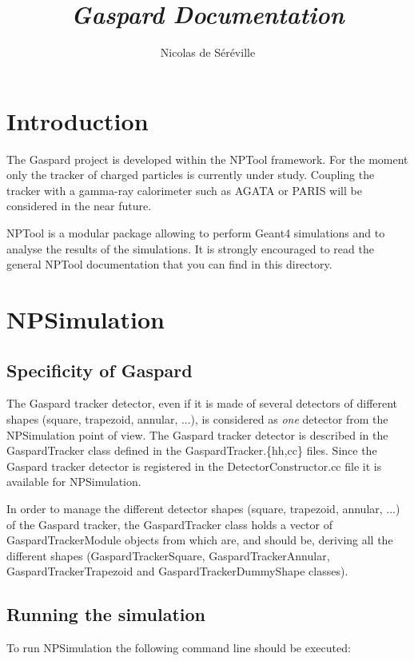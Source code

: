 \documentclass[a4paper,12pt]{article}
\begin{document}
\title{\emph{Gaspard Documentation}}
\author{Nicolas de S\'er\'eville}

\maketitle 
\pagebreak
\tableofcontents
\pagebreak


\section{Introduction}
The Gaspard project is developed within the NPTool framework. For the 
moment only the tracker of charged particles is currently under study.
Coupling the tracker with a gamma-ray calorimeter such as AGATA or
PARIS will be considered in the near future. 

NPTool is a modular package allowing to perform Geant4 simulations and to 
analyse the results of the simulations. It is strongly encouraged to read 
the general NPTool documentation that you can find in this directory.


\section{NPSimulation}
\subsection{Specificity of Gaspard}
The Gaspard tracker detector, even if it is made of several detectors of
different shapes (square, trapezoid, annular, ...), is considered as {\it one} 
detector from the NPSimulation point of view. The Gaspard tracker detector 
is described in the GaspardTracker class defined in the 
GaspardTracker.\{hh,cc\} files. Since the Gaspard tracker detector is 
registered in the DetectorConstructor.cc file it is available for NPSimulation.

In order to manage the different detector shapes (square, trapezoid, annular, 
...) of the Gaspard tracker, the GaspardTracker class holds a vector of 
GaspardTrackerModule objects from which are, and should be, deriving all 
the different shapes (GaspardTrackerSquare, GaspardTrackerAnnular,
GaspardTrackerTrapezoid and GaspardTrackerDummyShape classes).


\subsection{Running the simulation}
To run NPSimulation the following command line should be executed: 
\end{document}
